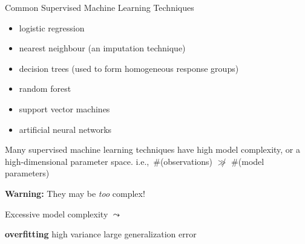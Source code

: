 

\begin{frame}{\large Common Supervised Machine Learning Techniques}

{\scriptsize
\begin{itemize}
\item
	logistic regression
\item
	nearest neighbour {\scriptsize (an imputation technique)}
\item
	decision trees {\scriptsize (used to form homogeneous response groups)}
\item
	random forest
\item
	support vector machines
\item
	artificial neural networks
\end{itemize}}

\large
\begin{center}
\pause
Many supervised machine learning techniques have high model complexity,
\pause or a high-dimensional parameter space.
\pause
\vskip 0.05cm
{\normalsize i.e.,\, \#(observations) \;$\not\gg$\; \#(model parameters)}

\vskip 0.4cm
\pause
\textbf{Warning:} They may be \textit{too} complex!

\pause
\vskip 0.4cm
\large Excessive model complexity
\;\;$\leadsto$\;\;
\begin{minipage}{3.5cm} \begin{center} \textbf{\Large\color{red}overfitting} \vskip 0.01cm {\scriptsize high variance \vskip -0.175cm large generalization error} \end{center} \end{minipage}
\end{center}

\end{frame}
\normalsize

